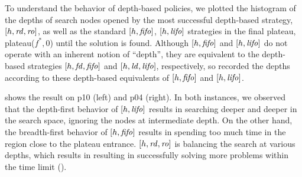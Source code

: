 To understand the behavior of depth-based policies, we plotted the histogram of
the depths of search nodes opened by
the most successful depth-based strategy, $[h,\mbox{\textit{rd}},\mbox{\textit{ro}}]$, as well as 
the standard $[h,\mbox{\textit{fifo}}]$, $[h,\mbox{\textit{lifo}}]$ strategies
in the final plateau, plateau($f^*,0$) until the solution is found.
% 
Although $[h,\mbox{\textit{fifo}}]$ and $[h,\mbox{\textit{lifo}}]$ do not operate with an inherent notion of ``depth'', 
they are equivalent to the depth-based strategies $[h,\mbox{\textit{fd}},\mbox{\textit{fifo}}]$ and $[h,\mbox{\textit{ld}},\mbox{\textit{lifo}}]$, respectively, so recorded the depths according to these depth-based equivalents of $[h,\mbox{\textit{fifo}}]$ and $[h,\mbox{\textit{lifo}}]$.

 shows the result
on
  p10 (left) and
  p04 (right).
In both instances, 
we observed that the depth-first behavior of $[h,\mbox{\textit{lifo}}]$ results in searching deeper and deeper in the search space, ignoring the nodes at intermediate depth.
On the other hand, the breadth-first behavior of $[h,\mbox{\textit{fifo}}]$ results in spending too much time in the region close to the plateau entrance.
$[h,\mbox{\textit{rd}},\mbox{\textit{ro}}]$ is balancing the search at various depths, which results in resulting in successfully solving more problems within the time limit (). %
% 


